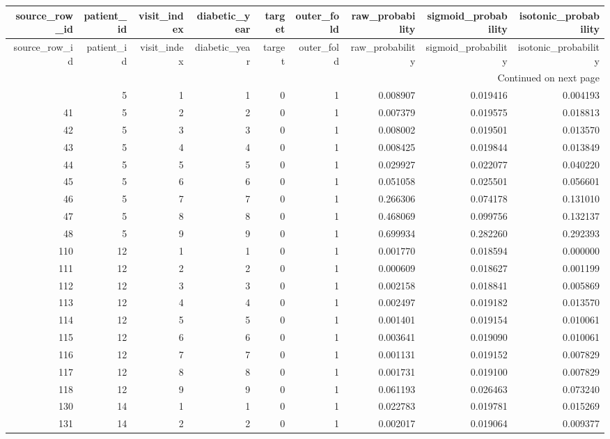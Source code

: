 \begin{longtable}{rrrrrrrrr}
\toprule
source\_row\_id & patient\_id & visit\_index & diabetic\_year & target & outer\_fold & raw\_probability & sigmoid\_probability & isotonic\_probability \\
\midrule
\endfirsthead
\toprule
source\_row\_id & patient\_id & visit\_index & diabetic\_year & target & outer\_fold & raw\_probability & sigmoid\_probability & isotonic\_probability \\
\midrule
\endhead
\midrule
\multicolumn{9}{r}{Continued on next page} \\
\midrule
\endfoot
\bottomrule
\endlastfoot
40 & 5 & 1 & 1 & 0 & 1 & 0.008907 & 0.019416 & 0.004193 \\
41 & 5 & 2 & 2 & 0 & 1 & 0.007379 & 0.019575 & 0.018813 \\
42 & 5 & 3 & 3 & 0 & 1 & 0.008002 & 0.019501 & 0.013570 \\
43 & 5 & 4 & 4 & 0 & 1 & 0.008425 & 0.019844 & 0.013849 \\
44 & 5 & 5 & 5 & 0 & 1 & 0.029927 & 0.022077 & 0.040220 \\
45 & 5 & 6 & 6 & 0 & 1 & 0.051058 & 0.025501 & 0.056601 \\
46 & 5 & 7 & 7 & 0 & 1 & 0.266306 & 0.074178 & 0.131010 \\
47 & 5 & 8 & 8 & 0 & 1 & 0.468069 & 0.099756 & 0.132137 \\
48 & 5 & 9 & 9 & 0 & 1 & 0.699934 & 0.282260 & 0.292393 \\
110 & 12 & 1 & 1 & 0 & 1 & 0.001770 & 0.018594 & 0.000000 \\
111 & 12 & 2 & 2 & 0 & 1 & 0.000609 & 0.018627 & 0.001199 \\
112 & 12 & 3 & 3 & 0 & 1 & 0.002158 & 0.018841 & 0.005869 \\
113 & 12 & 4 & 4 & 0 & 1 & 0.002497 & 0.019182 & 0.013570 \\
114 & 12 & 5 & 5 & 0 & 1 & 0.001401 & 0.019154 & 0.010061 \\
115 & 12 & 6 & 6 & 0 & 1 & 0.003641 & 0.019090 & 0.010061 \\
116 & 12 & 7 & 7 & 0 & 1 & 0.001131 & 0.019152 & 0.007829 \\
117 & 12 & 8 & 8 & 0 & 1 & 0.001731 & 0.019100 & 0.007829 \\
118 & 12 & 9 & 9 & 0 & 1 & 0.061193 & 0.026463 & 0.073240 \\
130 & 14 & 1 & 1 & 0 & 1 & 0.022783 & 0.019781 & 0.015269 \\
131 & 14 & 2 & 2 & 0 & 1 & 0.002017 & 0.019064 & 0.009377 \\

\end{longtable}
